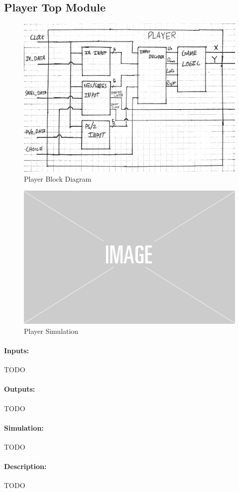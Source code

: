 \documentclass[]{article}
\begin{document}
\subsection{Player Top Module}
\begin{figure}[H]\centering
    \includegraphics[width=\linewidth]{figures/Player_Block.jpg}
    \caption{Player Block Diagram}
    \label{fig:playerBlock}
\end{figure}
\begin{figure}[H]\centering
    \includegraphics[width=0.5\linewidth]{figures/placeholder.png}
    \caption{Player Simulation}
    \label{fig:playerSim}
\end{figure}
\paragraph{Inputs:} TODO
\paragraph{Outputs:} TODO
\paragraph{Simulation:} TODO
\paragraph{Description:} TODO
\end{document}
